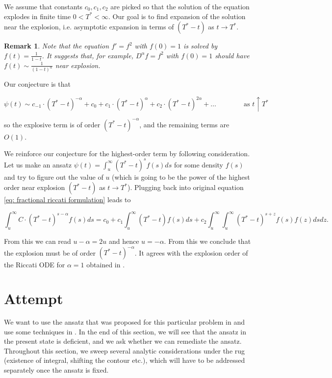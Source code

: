 \documentclass[12pt]{article}
\theoremstyle{plain}
\newtheorem{remark}[proposition]{Remark}
\begin{document}
\vspace{5pt}

We assume that constants $c_0, c_1, c_2$ are picked so that the solution of the equation explodes in finite time $0<T^*<\infty$. Our goal is to find expansion of the solution near the explosion, i.e. asymptotic expansion in terms of $(T^*-t)$ as $t\rightarrow T^*$.

\begin{remark}
Note that the equation $f'=f^2$ with $f(0) = 1$ is solved by $f(t) = \frac{1}{1-t}$. It suggests that, for example, $D^\alpha f = f^2$ with $f(0) = 1$ should have $f(t) \sim \frac{1}{(1-t)^\alpha}$ near explosion.
\end{remark}

Our conjecture is that 

$$
\psi(t) \sim c_{-1}\cdot (T^*-t)^{-\alpha} + c_0 + c_1\cdot (T^*-t)^\alpha + c_2\cdot (T^*-t)^{2\alpha} + \dots \qquad \qquad \text{as } t\uparrow T^*
$$

\vspace{5pt}

so the explosive term is of order $(T^*-t)^{-\alpha}$, and the remaining terms are $O(1)$.

We reinforce our conjecture for the highest-order term by following consideration. Let us make an ansatz $\psi(t) = \int_u ^\infty(T^* -t)^s f(s)ds$ for some density $f(s)$ and try to figure out the value of $u$ (which is going to be the power of the highest order near explosion $(T^* - t)$ as $t\rightarrow T^*$). Plugging back into original equation \eqref{eq: fractional riccati formulation} leads to

$$
\int_u ^\infty C \cdot(T^*-t)^{s-\alpha} f(s)ds = c_0 + c_1 \int_u ^\infty (T^*-t) f(s) ds + c_2 \int_u ^\infty\int_u ^\infty(T^*-t)^{s+z} f(s)f(z) dsdz .
$$

From this we can read $u - \alpha = 2u$ and hence $u = -\alpha$. From this we conclude that the explosion must be of order $(T^*-t)^{-\alpha}$. It agrees with the explosion order of the Riccati ODE for $\alpha=1$ obtained in \cite{FGGS10}.

\section{Attempt}

We want to use the ansatz that was proposed for this particular problem in \cite{RO96} and use some techniques in \cite{BH75}. In the end of this section, we will see that the ansatz in the present state is deficient, and we ask whether we can remediate the ansatz. Throughout this section, we sweep several analytic considerations under the rug (existence of integral, shifting the contour etc.), which will have to be addressed separately once the ansatz is fixed.
\end{document}
